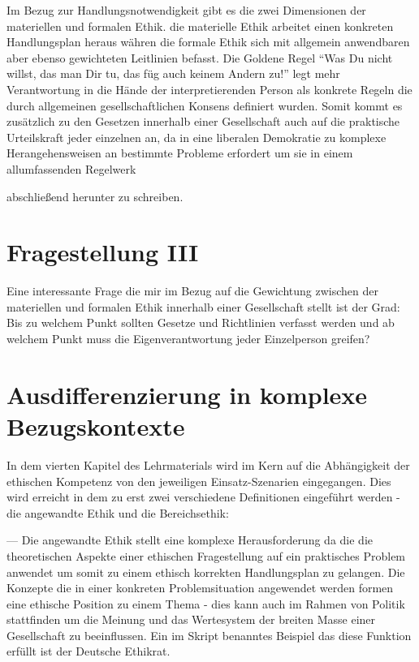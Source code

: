 \documentclass[journal]{IEEEtran}
\begin{document}
\begin{onecolumn}
Im Bezug zur Handlungsnotwendigkeit gibt es die zwei Dimensionen der materiellen und formalen Ethik.
die materielle Ethik arbeitet einen konkreten Handlungsplan heraus währen die formale Ethik sich mit
allgemein anwendbaren aber ebenso gewichteten Leitlinien befasst. Die Goldene Regel ``Was Du nicht willst,
das man Dir tu, das füg auch keinem Andern zu!'' legt mehr Verantwortung in die Hände der 
interpretierenden Person als konkrete Regeln die durch allgemeinen gesellschaftlichen Konsens
definiert wurden. Somit kommt es zusätzlich zu den Gesetzen innerhalb einer Gesellschaft auch auf
die praktische Urteilskraft jeder einzelnen an, da in eine liberalen Demokratie zu komplexe
Herangehensweisen an bestimmte Probleme erfordert um sie in einem allumfassenden Regelwerk

abschließend herunter zu schreiben. 

\section*{Fragestellung III}

Eine interessante Frage die mir im Bezug auf die Gewichtung zwischen der materiellen und formalen Ethik
innerhalb einer Gesellschaft stellt ist der Grad: Bis zu welchem Punkt sollten Gesetze und Richtlinien
verfasst werden und ab welchem Punkt muss die Eigenverantwortung jeder Einzelperson greifen?

\section{Ausdifferenzierung in komplexe Bezugskontexte}

In dem vierten Kapitel des Lehrmaterials wird im Kern auf die Abhängigkeit der ethischen Kompetenz von
den jeweiligen Einsatz-Szenarien eingegangen. Dies wird erreicht in dem zu erst zwei verschiedene
Definitionen eingeführt werden - die angewandte Ethik und die Bereichsethik:

--- Die angewandte Ethik stellt eine komplexe Herausforderung da die die theoretischen Aspekte einer
ethischen Fragestellung auf ein praktisches Problem anwendet um somit zu einem ethisch korrekten 
Handlungsplan zu gelangen. Die Konzepte die in einer konkreten Problemsituation angewendet werden
formen eine ethische Position zu einem Thema - dies kann auch im Rahmen von Politik stattfinden um die
Meinung und das Wertesystem der breiten Masse einer Gesellschaft zu beeinflussen. Ein im Skript benanntes
Beispiel das diese Funktion erfüllt ist der Deutsche Ethikrat.


\end{onecolumn}
\end{document}
